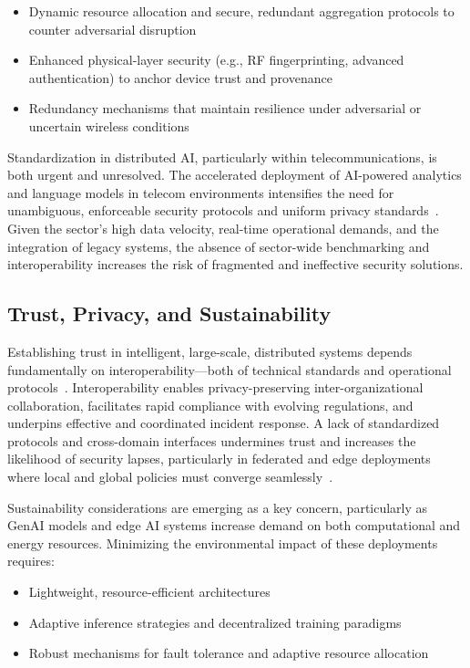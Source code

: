 \begin{itemize}
    \item Dynamic resource allocation and secure, redundant aggregation protocols to counter adversarial disruption~\cite{ref49}
    \item Enhanced physical-layer security (e.g., RF fingerprinting, advanced authentication) to anchor device trust and provenance~\cite{ref48}
    \item Redundancy mechanisms that maintain resilience under adversarial or uncertain wireless conditions
\end{itemize}

Standardization in distributed AI, particularly within telecommunications, is both urgent and unresolved. The accelerated deployment of AI-powered analytics and language models in telecom environments intensifies the need for unambiguous, enforceable security protocols and uniform privacy standards~\cite{ref42,ref44,ref49}. Given the sector's high data velocity, real-time operational demands, and the integration of legacy systems, the absence of sector-wide benchmarking and interoperability increases the risk of fragmented and ineffective security solutions.

\subsection{Trust, Privacy, and Sustainability}

Establishing trust in intelligent, large-scale, distributed systems depends fundamentally on interoperability—both of technical standards and operational protocols~\cite{ref7,ref17,ref18,ref19,ref20,ref21,ref23,ref24,ref26}. Interoperability enables privacy-preserving inter-organizational collaboration, facilitates rapid compliance with evolving regulations, and underpins effective and coordinated incident response. A lack of standardized protocols and cross-domain interfaces undermines trust and increases the likelihood of security lapses, particularly in federated and edge deployments where local and global policies must converge seamlessly~\cite{ref26}.

Sustainability considerations are emerging as a key concern, particularly as GenAI models and edge AI systems increase demand on both computational and energy resources. Minimizing the environmental impact of these deployments requires:

\begin{itemize}
    \item Lightweight, resource-efficient architectures
    \item Adaptive inference strategies and decentralized training paradigms
    \item Robust mechanisms for fault tolerance and adaptive resource allocation
\end{itemize}

